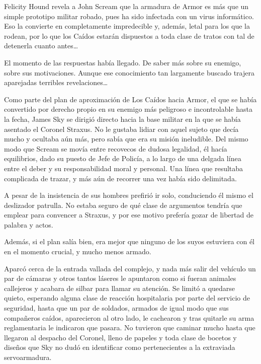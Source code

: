 \begin{prev}
    Felicity Hound revela a John Scream que la armadura de Armor es más que un simple prototipo militar robado, pues ha sido infectada con un virus informático. Eso la convierte en completamente impredecible y, además, letal para los que la rodean, por lo que los Caídos estarán dispuestos a toda clase de tratos con tal de detenerla cuanto antes\dots
\end{prev}

\noindent
El momento de las respuestas había llegado. De saber más sobre su enemigo, sobre sus motivaciones. Aunque ese conocimiento tan largamente buscado trajera aparejadas terribles revelaciones\dots

\bigskip\noindent
Como parte del plan de aproximación de Los Caídos hacia Armor, el que se había convertido por derecho propio en su enemigo más peligroso e incontrolable hasta la fecha, James Sky se dirigió directo hacia la base militar en la que se había asentado el Coronel Straxus. No le gustaba lidiar con aquel sujeto que decía mucho y ocultaba aún más, pero sabía que era su misión ineludible. Del mismo modo que Scream se movía entre recovecos de dudosa legalidad, él hacía equilibrios, dado su puesto de Jefe de Policía, a lo largo de una delgada línea entre el deber y su responsabilidad moral y personal. Una línea que resultaba complicada de trazar, y más aún de recorrer una vez había sido delimitada.

A pesar de la insistencia de sus hombres prefirió ir solo, conduciendo él mismo el deslizador patrulla. No estaba seguro de qué clase de argumentos tendría que emplear para convencer a Straxus, y por ese motivo prefería gozar de libertad de palabra y actos.

Además, si el plan salía bien, era mejor que ninguno de los suyos estuviera con él en el momento crucial, y mucho menos armado.

Aparcó cerca de la entrada vallada del complejo, y nada más salir del vehículo un par de cámaras y otros tantos láseres le apuntaron como si fueran animales callejeros y acabara de silbar para llamar su atención. Se limitó a quedarse quieto, esperando alguna clase de reacción hospitalaria por parte del servicio de seguridad, hasta que un par de soldados, armados de igual modo que sus compañeros caídos, aparecieron al otro lado, le cachearon y tras quitarle su arma reglamentaria le indicaron que pasara. No tuvieron que caminar mucho hasta que llegaron al despacho del Coronel, lleno de papeles y toda clase de bocetos y diseños que Sky no dudó en identificar como pertenecientes a la extraviada servoarmadura.

